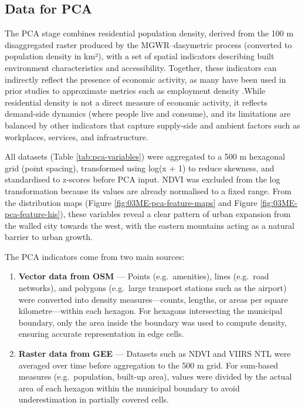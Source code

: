\documentclass[
  12pt,
  oneside]{book}
\begin{document}
\subsection{Data for PCA}\label{data-for-pca}

The PCA stage combines residential population density, derived from the 100 m disaggregated raster produced by the MGWR--dasymetric process (converted to population density in km²), with a set of spatial indicators describing built environment characteristics and accessibility. Together, these indicators can indirectly reflect the presence of economic activity, as many have been used in prior studies to approximate metrics such as employment density \autocite{barzinWhereAreAll2022a}.While residential density is not a direct measure of economic activity, it reflects demand-side dynamics (where people live and consume), and its limitations are balanced by other indicators that capture supply-side and ambient factors such as workplaces, services, and infrastructure.

All datasets (Table \ref{tab:pca-variables}) were aggregated to a 500 m hexagonal grid (point spacing), transformed using log(x + 1) to reduce skewness, and standardised to z-scores before PCA input. NDVI was excluded from the log transformation because its values are already normalised to a fixed range. From the distribution maps (Figure \ref{fig:03ME-pca-feature-maps} and Figure \ref{fig:03ME-pca-feature-his}), these variables reveal a clear pattern of urban expansion from the walled city towards the west, with the eastern mountains acting as a natural barrier to urban growth.

The PCA indicators come from two main sources:

\begin{enumerate}
\def\labelenumi{\arabic{enumi}.}
\item
  \textbf{Vector data from OSM} --- Points (e.g.~amenities), lines (e.g.~road networks), and polygons (e.g.~large transport stations such as the airport) were converted into density measures---counts, lengths, or areas per square kilometre---within each hexagon. For hexagons intersecting the municipal boundary, only the area inside the boundary was used to compute density, ensuring accurate representation in edge cells.
\item
  \textbf{Raster data from GEE} --- Datasets such as NDVI and VIIRS NTL were averaged over time before aggregation to the 500 m grid. For sum-based measures (e.g.~population, built-up area), values were divided by the actual area of each hexagon within the municipal boundary to avoid underestimation in partially covered cells.
\end{enumerate}
\end{document}
